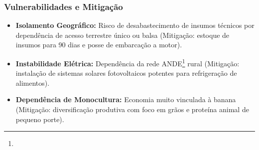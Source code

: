 \subsubsection{Vulnerabilidades e
Mitigação}

\begin{itemize}
\tightlist
\item
  \textbf{Isolamento Geográfico:} Risco de desabastecimento de insumos
  técnicos por dependência de acesso terrestre único ou balsa
  (Mitigação: estoque de insumos para 90 dias e posse de embarcação a
  motor).
\item
  \textbf{Instabilidade Elétrica:} Dependência da rede ANDE\footnote{\fineANDE} rural
  (Mitigação: instalação de sistemas solares fotovoltaicos potentes para
  refrigeração de alimentos).
\item
  \textbf{Dependência de Monocultura:} Economia muito vinculada à banana
  (Mitigação: diversificação produtiva com foco em grãos e proteína
  animal de pequeno porte).
\end{itemize}

